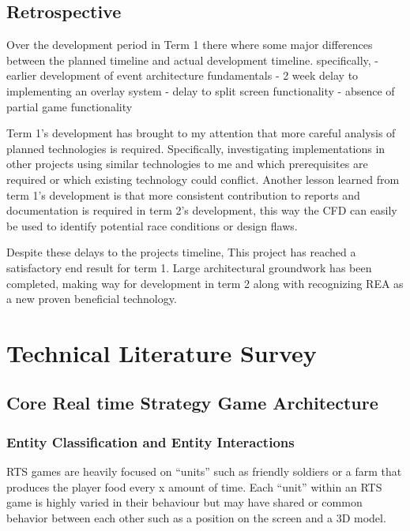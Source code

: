 \documentclass[]{final_report}
\begin{document}
\section{Retrospective}
Over the development period in Term 1 there where some major differences between the planned timeline and actual development timeline. specifically, \newline
	- earlier development of event architecture fundamentals \newline
	- 2 week delay to implementing an overlay system \newline
	- delay to split screen functionality \newline
	- absence of partial game functionality \newline

Term 1's development has brought to my attention that more careful analysis of planned technologies is required. Specifically, investigating implementations in other projects using similar technologies to me and which prerequisites are required or which existing technology could conflict. Another lesson learned from term 1's development is that more consistent contribution to reports and documentation is required in term 2's development, this way the CFD can easily be used to identify potential race conditions or design flaws.

Despite these delays to the projects timeline, This project has reached a satisfactory end result for term 1. Large architectural groundwork has been completed, making way for development in term 2 along with recognizing REA as a new proven beneficial technology.


\newpage
\chapter{Technical Literature Survey}
\section{Core Real time Strategy Game Architecture}
\subsection{Entity Classification and Entity Interactions}
RTS games are heavily focused on “units” such as friendly soldiers or a farm that produces the player food every x amount of time. Each “unit” within an RTS game is highly varied in their behaviour but may have shared or common behavior between each other such as a position on the screen and a 3D model. \newline
\end{document}
